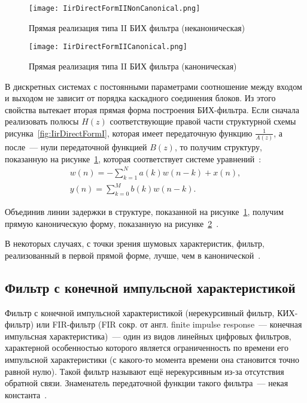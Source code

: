 \begin{figure}[ht]
	\centering
	\texttt{[image: IirDirectFormIINonCanonical.png]}  
	\caption{Прямая реализация типа II БИХ фильтра (неканоническая)}
	\label{fig:IirDirectFormIINonCanonical}
\end{figure}

\begin{figure}[ht]
	\centering
	\texttt{[image: IirDirectFormIICanonical.png]}  
	\caption{Прямая реализация типа II БИХ фильтра (каноническая)}
	\label{fig:IirDirectFormIICanonical}
\end{figure}

В дискретных системах с постоянными параметрами соотношение между входом и выходом не зависит от порядка каскадного соединения блоков. Из этого свойства вытекает вторая прямая форма построения БИХ-фильтра. Если сначала реализовать полюсы $H(z)$ соответствующие правой части структурной схемы рисунка~\ref{fig:IirDirectFormI}, которая имеет передаточную функцию $\frac{1}{A(z)}$, а после~--- нули передаточной функцией $B(z)$, то получим структуру, показанную на рисунке~\ref{fig:IirDirectFormIINonCanonical}, которая соответствует системе уравнений~\cite{Wiki_IIR}:
\begin{gather}
	w(n) = -\sum_ {k=1}^{N} a(k)w(n - k) + x(n), \\
	y(n) = \sum_ {k=0}^{M} b(k)w(n - k).
\end{gather}

Объединив линии задержки в структуре, показанной на рисунке~\ref{fig:IirDirectFormIINonCanonical}, получим прямую каноническую форму, показанную на рисунке~\ref{fig:IirDirectFormIICanonical}~\cite{Wiki_IIR}.

В некоторых случаях, с точки зрения шумовых характеристик, фильтр, реализованный в первой прямой форме, лучше, чем в канонической~\cite{Wiki_IIR}.

\subsection{Фильтр с конечной импульсной характеристикой}
\label{section:FIR}
Фильтр с конечной импульсной характеристикой (нерекурсивный фильтр, КИХ-фильтр) или FIR-фильтр (FIR сокр. от англ. \foreignlanguage{english}{finite impulse response}~--- конечная импульсная характеристика)~--- один из видов линейных цифровых фильтров, характерной особенностью которого является ограниченность по времени его импульсной характеристики (с какого-то момента времени она становится точно равной нулю). Такой фильтр называют ещё нерекурсивным из-за отсутствия обратной связи. Знаменатель передаточной функции такого фильтра~--- некая константа~\cite{Wiki_FIR}.

